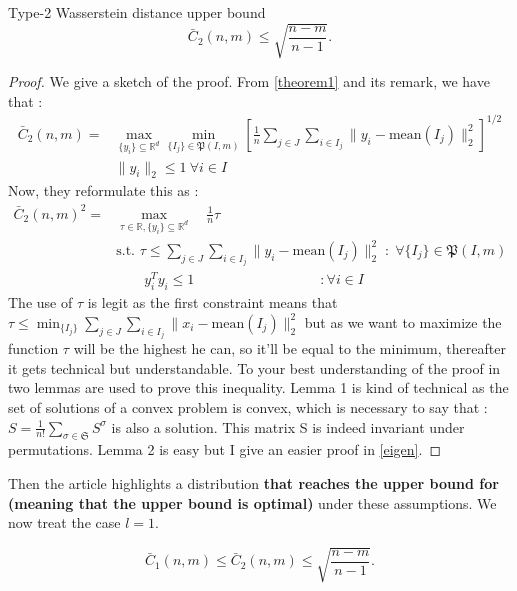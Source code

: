 \documentclass{amsart}
\newcommand{\RR}{\mathbb{R}}
\begin{document}
\begin{theorem} Type-2 Wasserstein distance upper bound
    $$\bar{C}_2\left(n,m \right)\leq \sqrt{\frac{n-m}{n-1}}.$$
\end{theorem}
\begin{proof}
    We give a sketch of the proof. From \ref{theorem1} and its remark, we have that : 
    \begin{align*}\bar{C}_2\left(n,m\right)=&
        \max_{\{y_i\}\subseteq\RR^d}\min_{\{I_j\}\in\mathfrak{P}\left(I,m\right)}\left[\frac{1}{n}\sum_{j\in J}\sum_{i\in I_j}\lVert y_i-\text{mean}\left(I_j\right)\rVert_2^2\right]^{1/2} \\ &\lVert y_i\rVert_2\leq1 \:\forall i\in I
    \end{align*}
    Now, they reformulate this as : 
    \begin{align*}\bar{C}_2\left(n,m\right)^2=&
        \max_{\tau\in\RR, \{y_i\}\subseteq\RR^d}\quad\frac{1}{n}\tau \\ &\text{s.t. }\tau\leq\sum_{j\in J}\sum_{i\in I_j}\lVert y_i-\text{mean}\left(I_j\right)\rVert_2^2\; :\; \forall \{I_j\}\in\mathfrak{P}\left(I,m\right) \\
        &\quad\quad y_i^Ty_i\leq1 \quad\quad\quad\quad\quad\quad\quad\quad\quad : \forall i\in I
    \end{align*}
    The use of $\tau$ is legit as the first constraint means that $\tau\leq\min_{\{I_j\}}\sum_{j\in J}\sum_{i\in I_j}\lVert x_i-\text{mean}(I_j)\rVert_2^2$ but as we want to maximize the function $\tau$ will be the highest he can, so it'll be equal to the minimum, thereafter it gets technical but understandable. To your best understanding of the proof in \cite[Theorem 2]{rujeerapaiboon_scenario_2022} two lemmas are used to prove this inequality. Lemma 1 is kind of technical as the set of solutions of a convex problem is convex, which is necessary to say that : $S=\frac{1}{n!}\sum_{\sigma\in\mathfrak{S}}S^\sigma$ is also a solution. This matrix S is indeed invariant under permutations. Lemma 2 is easy but I give an easier proof in \ref{eigen}.
\end{proof}

Then the article highlights a distribution \textbf{that reaches the upper bound for (meaning that the upper bound is optimal)} under these assumptions. We now treat the case $l=1$.

\begin{theorem}
    $$\bar{C}_1\left(n,m \right)\leq\bar{C}_2\left(n,m \right) \leq\sqrt{\frac{n-m}{n-1}}.$$
\end{theorem}
\end{document}

